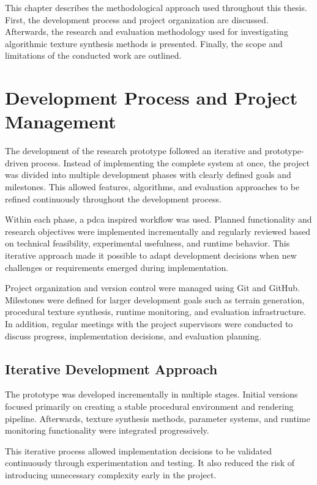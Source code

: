 This chapter describes the methodological approach used throughout this thesis. First, the development process and project organization are discussed. Afterwards, the research and evaluation methodology used for investigating algorithmic texture synthesis methods is presented. Finally, the scope and limitations of the conducted work are outlined.

\section{Development Process and Project Management}

The development of the research prototype followed an iterative and prototype-driven process. Instead of implementing the complete system at once, the project was divided into multiple development phases with clearly defined goals and milestones. This allowed features, algorithms, and evaluation approaches to be refined continuously throughout the development process.

Within each phase, a \gls{pdca} inspired workflow was used. Planned functionality and research objectives were implemented incrementally and regularly reviewed based on technical feasibility, experimental usefulness, and runtime behavior. This iterative approach made it possible to adapt development decisions when new challenges or requirements emerged during implementation.

Project organization and version control were managed using Git and GitHub. Milestones were defined for larger development goals such as terrain generation, procedural texture synthesis, runtime monitoring, and evaluation infrastructure. In addition, regular meetings with the project supervisors were conducted to discuss progress, implementation decisions, and evaluation planning.

\subsection{Iterative Development Approach}

The prototype was developed incrementally in multiple stages. Initial versions focused primarily on creating a stable procedural environment and rendering pipeline. Afterwards, texture synthesis methods, parameter systems, and runtime monitoring functionality were integrated progressively.

This iterative process allowed implementation decisions to be validated continuously through experimentation and testing. It also reduced the risk of introducing unnecessary complexity early in the project.

